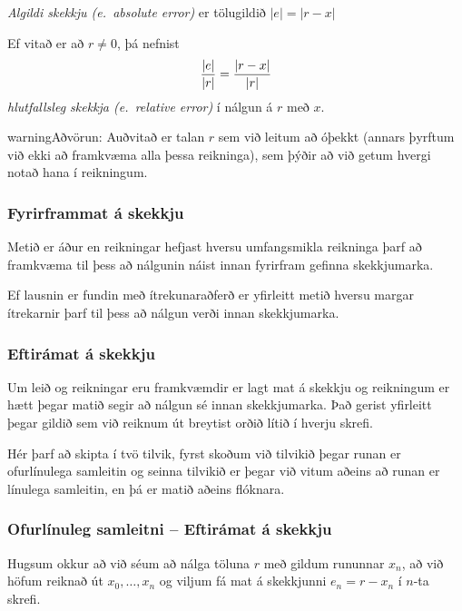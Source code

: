 \documentclass[a4paper,10pt,icelandic]{sphinxmanual}
\begin{document}
\emph{Algildi skekkju (e. absolute error)} er tölugildið \(|e|=|r-x|\)

Ef vitað er að \(r\neq 0\), þá nefnist
\begin{gather}
\begin{split}\dfrac{|e|}{|r|}=\dfrac{|r-x|}{|r|}\end{split}\notag
\end{gather}
\emph{hlutfallsleg skekkja (e. relative error)} í nálgun á \(r\) með
\(x\).

\begin{notice}{warning}{Aðvörun:}
Auðvitað er talan \(r\) sem við leitum að óþekkt (annars
þyrftum við ekki að framkvæma alla þessa reikninga), sem þýðir að við
getum hvergi notað hana í reikningum.
\end{notice}


\subsubsection{Fyrirframmat á skekkju}
\label{kafli01:index-6}\label{kafli01:fyrirframmat-a-skekkju}
Metið er áður en reikningar hefjast hversu umfangsmikla reikninga þarf
að framkvæma til þess að nálgunin náist innan fyrirfram gefinna
skekkjumarka.

Ef lausnin er fundin með ítrekunaraðferð er yfirleitt metið hversu
margar ítrekarnir þarf til þess að nálgun verði innan skekkjumarka.


\subsubsection{Eftirámat á skekkju}
\label{kafli01:eftiramat-a-skekkju}\label{kafli01:index-7}
Um leið og reikningar eru framkvæmdir er lagt mat á skekkju og
reikningum er hætt þegar matið segir að nálgun sé innan skekkjumarka.
Það gerist yfirleitt þegar gildið sem við reiknum út breytist orðið
lítið í hverju skrefi.

Hér þarf að skipta í tvö tilvik, fyrst skoðum við tilvikið þegar runan er ofurlínulega samleitin
og seinna tilvikið er þegar við vitum aðeins að runan er línulega samleitin, en
þá er matið aðeins flóknara.


\subsubsection{Ofurlínuleg samleitni -- Eftirámat á skekkju}
\label{kafli01:ofurlinuleg-samleitni-eftiramat-a-skekkju}\label{kafli01:index-8}
Hugsum okkur að við séum að nálga töluna \(r\) með gildum rununnar
\(x_n\), að við höfum reiknað út \(x_0,\dots,x_n\) og viljum fá
mat á skekkjunni \(e_n=r-x_n\) í \(n\)-ta skrefi.
\end{document}
